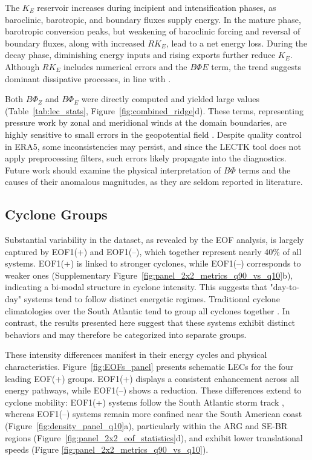 \documentclass[pdflatex,sn-chicago]{sn-jnl}%
\theoremstyle{plain}
\theoremstyle{definition}
\theoremstyle{remark}
\theoremstyle{definition}
\begin{document}
The $K_E$ reservoir increases during incipient and intensification phases, as baroclinic, barotropic, and boundary fluxes supply energy. In the mature phase, barotropic conversion peaks, but weakening of baroclinic forcing and reversal of boundary fluxes, along with increased $RK_E$, lead to a net energy loss. During the decay phase, diminishing energy inputs and rising exports further reduce $K_E$. Although $RK_E$ includes numerical errors and the $B\Phi E$ term, the trend suggests dominant dissipative processes, in line with \citet{smith1980energetics}.

Both $B\Phi_Z$ and $B\Phi_E$ were directly computed and yielded large values (Table~\ref{tab:lec_stats}, Figure~\ref{fig:combined_ridge}d). These terms, representing pressure work by zonal and meridional winds at the domain boundaries, are highly sensitive to small errors in the geopotential field \citep{brennan1980zonal}. Despite quality control in ERA5, some inconsistencies may persist, and since the LECTK tool does not apply preprocessing filters, such errors likely propagate into the diagnostics. Future work should examine the physical interpretation of $B\Phi$ terms and the causes of their anomalous magnitudes, as they are seldom reported in literature.


\subsection{Cyclone Groups}

Substantial variability in the dataset, as revealed by the EOF analysis, is largely captured by EOF1(+) and EOF1(–), which together represent nearly 40\% of all systems. EOF1(+) is linked to stronger cyclones, while EOF1(–) corresponds to weaker ones (Supplementary Figure~\ref{fig:panel_2x2_metrics_q90_vs_q10}b), indicating a bi-modal structure in cyclone intensity. This suggests that "day-to-day" systems tend to follow distinct energetic regimes. Traditional cyclone climatologies over the South Atlantic tend to group all cyclones together \citep[e.g.,]{sinclair1994objective,hoskins2005new,reboita2010south,gramcianinov2019properties}. In contrast, the results presented here suggest that these systems exhibit distinct behaviors and may therefore be categorized into separate groups.


These intensity differences manifest in their energy cycles and physical characteristics. Figure~\ref{fig:EOFs_panel} presents schematic LECs for the four leading EOF(+) groups. EOF1(+) displays a consistent enhancement across all energy pathways, while EOF1(–) shows a reduction. These differences extend to cyclone mobility: EOF1(+) systems follow the South Atlantic storm track \citep{hoskins2005new,gramcianinov2019properties}, whereas EOF1(–) systems remain more confined near the South American coast (Figure~\ref{fig:density_panel_q10}a), particularly within the ARG and SE-BR regions (Figure~\ref{fig:panel_2x2_eof_statistics}d), and exhibit lower translational speeds (Figure \ref{fig:panel_2x2_metrics_q90_vs_q10}).
\end{document}
